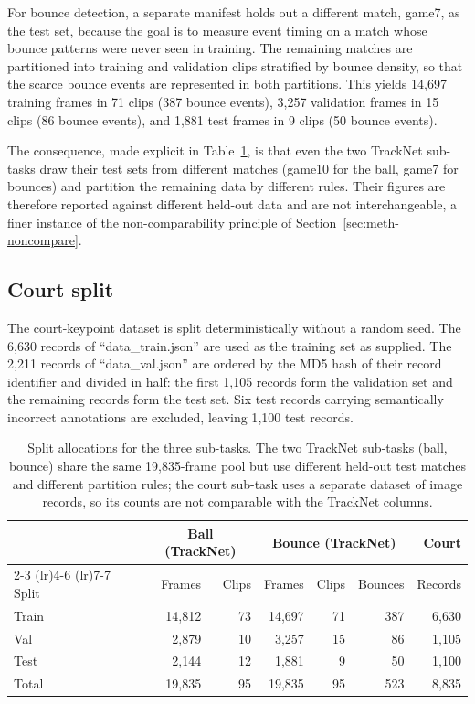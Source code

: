 For bounce detection, a separate manifest holds out a different match,
game7, as the test set, because the goal is to measure event timing on a
match whose bounce patterns were never seen in training. The remaining matches
are partitioned into training and validation clips stratified by bounce density,
so that the scarce bounce events are represented in both partitions. This yields
14{,}697 training frames in 71 clips (387 bounce events), 3{,}257 validation
frames in 15 clips (86 bounce events), and 1{,}881 test frames in 9 clips (50
bounce events).

The consequence, made explicit in Table~\ref{tab:splits}, is that even the two
TrackNet sub-tasks draw their test sets from different matches
(game10 for the ball, game7 for bounces) and partition the
remaining data by different rules. Their figures are therefore reported against
different held-out data and are not interchangeable, a finer instance of the
non-comparability principle of Section~\ref{sec:meth-noncompare}.

\subsection{Court split}
\label{sec:meth-splits-court}

The court-keypoint dataset is split deterministically without a random seed.
The 6{,}630 records of ``data\_train.json'' are used as the training set
as supplied. The 2{,}211 records of ``data\_val.json'' are ordered by the MD5 hash of their
record identifier and divided in half: the first 1{,}105
records form the validation set and the remaining records form the test set.
Six test records carrying semantically incorrect annotations are excluded,
leaving 1{,}100 test records.

\begin{table}[h]
  \centering
  \small
  \caption{Split allocations for the three sub-tasks. The two TrackNet sub-tasks
    (ball, bounce) share the same 19{,}835-frame pool but use different held-out
    test matches and different partition rules; the court sub-task uses a
    separate dataset of image records, so its counts are not comparable with the
    TrackNet columns.}
  \label{tab:splits}
  \begin{tabular}{l rr rrr r}
    \toprule
    & \multicolumn{2}{c}{Ball (TrackNet)} & \multicolumn{3}{c}{Bounce (TrackNet)} & Court \\
    \cmidrule(lr){2-3} \cmidrule(lr){4-6} \cmidrule(lr){7-7}
    Split & Frames & Clips & Frames & Clips & Bounces & Records \\
    \midrule
    Train & 14{,}812 & 73 & 14{,}697 & 71 & 387 & 6{,}630 \\
    Val   &  2{,}879 & 10 &  3{,}257 & 15 &  86 & 1{,}105 \\
    Test  &  2{,}144 & 12 &  1{,}881 &  9 &  50 & 1{,}100 \\
    \midrule
    Total & 19{,}835 & 95 & 19{,}835 & 95 & 523 & 8{,}835 \\
    \bottomrule
  \end{tabular}
\end{table}


